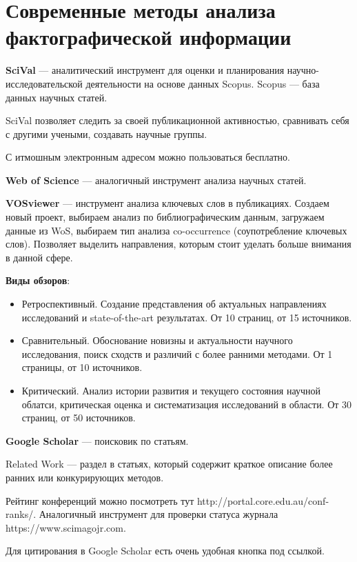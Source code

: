 \section{Современные методы анализа фактографической информации}

\textbf{SciVal} --- аналитический инструмент для оценки и планирования
научно-исследовательской деятельности на основе данных Scopus. Scopus --- база
данных научных статей.

SciVal позволяет следить за своей публикационной активностью, сравнивать себя с
другими учеными, создавать научные группы.

С итмошным электронным адресом можно пользоваться бесплатно.

\textbf{Web of Science} --- аналогичный инструмент анализа научных статей.

\textbf{VOSviewer} --- инструмент анализа ключевых слов в публикациях. Создаем
новый проект, выбираем анализ по библиографическим данным, загружаем данные из
WoS, выбираем тип анализа co-occurrence (соупотребление ключевых слов).
Позволяет выделить направления, которым стоит уделать больше внимания в данной
сфере.

\textbf{Виды обзоров}:
\begin{itemize}
    \item Ретроспективный. Создание представления об актуальных направлениях
        исследований и state-of-the-art результатах. От 10 страниц, от 15
        источников.

    \item Сравнительный. Обоснование новизны и актуальности научного
        исследования, поиск сходств и различий с более ранними методами. От 1
        страницы, от 10 источников.

    \item Критический. Анализ истории развития и текущего состояния научной
        облатси, критическая оценка и систематизация исследований в области. От
        30 страниц, от 50 источников.
\end{itemize}

\textbf{Google Scholar} --- поисковик по статьям.

Related Work --- раздел в статьях, который содержит краткое описание более
ранних или конкурирующих методов.

Рейтинг конференций можно посмотреть тут http://portal.core.edu.au/conf-ranks/.
Аналогичный инструмент для проверки статуса журнала https://www.scimagojr.com.

Для цитирования в Google Scholar есть очень удобная кнопка под ссылкой.

